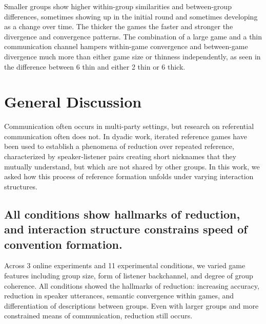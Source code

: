 \documentclass[
  english,
  a4paper,
]{article}
\begin{document}
Smaller groups show higher within-group similarities and between-group differences, sometimes showing up in the initial round and sometimes developing as a change over time. The thicker the games the faster and stronger the divergence and convergence patterns. The combination of a large game and a thin communication channel hampers within-game convergence and between-game divergence much more than either game size or thinness independently, as seen in the difference between 6 thin and either 2 thin or 6 thick.

\hypertarget{general-discussion}{%
\section{General Discussion}\label{general-discussion}}

Communication often occurs in multi-party settings, but research on referential communication often does not. In dyadic work, iterated reference games have been used to establish a phenomena of reduction over repeated reference, characterized by speaker-listener pairs creating short nicknames that they mutually understand, but which are not shared by other groups. In this work, we asked how this process of reference formation unfolds under varying interaction structures.

\hypertarget{all-conditions-show-hallmarks-of-reduction-and-interaction-structure-constrains-speed-of-convention-formation.}{%
\subsection{All conditions show hallmarks of reduction, and interaction structure constrains speed of convention formation.}\label{all-conditions-show-hallmarks-of-reduction-and-interaction-structure-constrains-speed-of-convention-formation.}}

Across 3 online experiments and 11 experimental conditions, we varied game features including group size, form of listener backchannel, and degree of group coherence. All conditions showed the hallmarks of reduction: increasing accuracy, reduction in speaker utterances, semantic convergence within games, and differentiation of descriptions between groups. Even with larger groups and more constrained means of communication, reduction still occurs.
\end{document}
